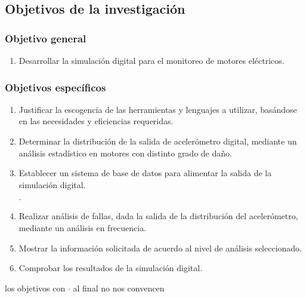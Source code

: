 \subsection{Objetivos de la investigación}

\subsubsection{Objetivo general}
	\begin{enumerate}
		\item  Desarrollar la simulación digital para el monitoreo de motores eléctricos.
	\end{enumerate}
	
\subsubsection{Objetivos específicos}

	\begin{enumerate}
		\item Justificar la escogencia de las herramientas y lenguajes a utilizar, basándose en las necesidades y eficiencias requeridas.

		\item Determinar la distribución de la salida de acelerómetro digital, mediante un análisis estadístico en motores con distinto grado de daño.

		\item Establecer un sistema de base de datos para alimentar la salida de la simulación digital.
		\begin{huge}
			$\cdot$ 
		\end{huge}

		\item Realizar análisis de fallas, dada la salida de la distribución del acelerómetro, mediante un análisis en frecuencia.

		\item Mostrar la información solicitada de acuerdo al nivel de análisis seleccionado.

		\item Comprobar los resultados de la simulación digital.
	\end{enumerate}

	\vspace*{3cm}
	\begin{huge}
		los objetivos con $\cdot$ al final no nos convencen	
	\end{huge}

